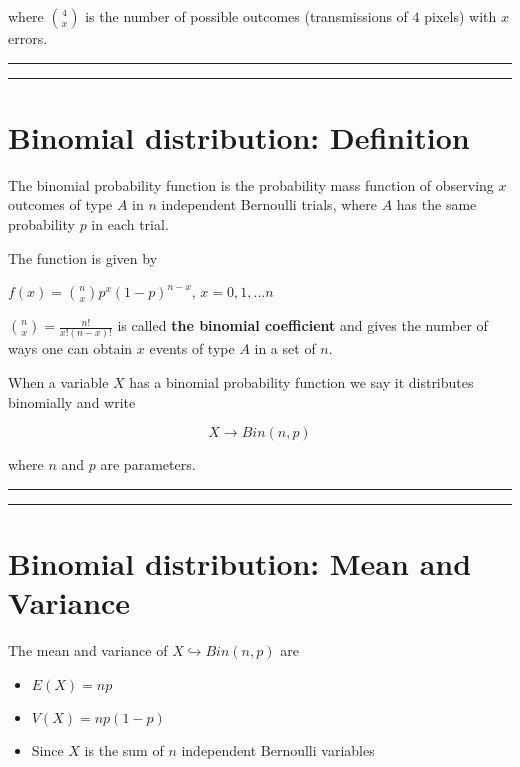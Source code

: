\documentclass[
]{book}
\begin{document}
where \(\binom 4 x\) is the number of possible outcomes (transmissions of \(4\) pixels) with \(x\) errors.

\begin{center}\rule{0.5\linewidth}{0.5pt}\end{center}

\begin{center}\rule{0.5\linewidth}{0.5pt}\end{center}

\hypertarget{binomial-distribution-definition}{%
\section{Binomial distribution: Definition}\label{binomial-distribution-definition}}

The binomial probability function is the probability mass function of observing \(x\) outcomes of type \(A\) in \(n\) independent Bernoulli trials, where \(A\) has the same probability \(p\) in each trial.

The function is given by

\(f(x)=\binom n x p^x(1-p)^{n-x}\), \(x=0,1,...n\)

\(\binom n x= \frac{n!}{x!(n-x)!}\) is called \textbf{the binomial coefficient} and gives the number of ways one can obtain \(x\) events of type \(A\) in a set of \(n\).

When a variable \(X\) has a binomial probability function we say it distributes binomially and write

\[X\rightarrow Bin(n,p)\]

where \(n\) and \(p\) are parameters.

\begin{center}\rule{0.5\linewidth}{0.5pt}\end{center}

\begin{center}\rule{0.5\linewidth}{0.5pt}\end{center}

\hypertarget{binomial-distribution-mean-and-variance}{%
\section{Binomial distribution: Mean and Variance}\label{binomial-distribution-mean-and-variance}}

The mean and variance of \(X\hookrightarrow Bin(n,p)\) are

\begin{itemize}
\item
  \(E(X)=np\)
\item
  \(V(X)=np(1-p)\)
\item
  Since \(X\) is the sum of \(n\) independent Bernoulli variables
\end{itemize}
\end{document}
